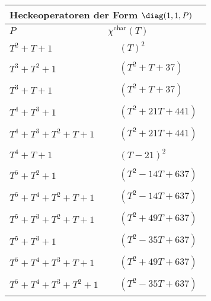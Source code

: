 \begin{tabular}{| l | l |}
\multicolumn{2}{l}{\bf Heckeoperatoren der Form $\diag(1,1,P)$} \\
\hline
$P$ & $\chi^\text{char}(T)$ \\
\hline
$T^2 + T + 1$ &
$\!\begin{aligned}
	&(T)^{2}\end{aligned}$ \\
\hline
$T^3 + T^2 + 1$ &
$\!\begin{aligned}
	&(T^{2} + T + 37)\end{aligned}$ \\
\hline
$T^3 + T + 1$ &
$\!\begin{aligned}
	&(T^{2} + T + 37)\end{aligned}$ \\
\hline
$T^4 + T^3 + 1$ &
$\!\begin{aligned}
	&(T^{2} + 21T + 441)\end{aligned}$ \\
\hline
$T^4 + T^3 + T^2 + T + 1$ &
$\!\begin{aligned}
	&(T^{2} + 21T + 441)\end{aligned}$ \\
\hline
$T^4 + T + 1$ &
$\!\begin{aligned}
	&(T - 21)^{2}\end{aligned}$ \\
\hline
$T^5 + T^2 + 1$ &
$\!\begin{aligned}
	&(T^{2} - 14T + 637)\end{aligned}$ \\
\hline
$T^5 + T^4 + T^2 + T + 1$ &
$\!\begin{aligned}
	&(T^{2} - 14T + 637)\end{aligned}$ \\
\hline
$T^5 + T^3 + T^2 + T + 1$ &
$\!\begin{aligned}
	&(T^{2} + 49T + 637)\end{aligned}$ \\
\hline
$T^5 + T^3 + 1$ &
$\!\begin{aligned}
	&(T^{2} - 35T + 637)\end{aligned}$ \\
\hline
$T^5 + T^4 + T^3 + T + 1$ &
$\!\begin{aligned}
	&(T^{2} + 49T + 637)\end{aligned}$ \\
\hline
$T^5 + T^4 + T^3 + T^2 + 1$ &
$\!\begin{aligned}
	&(T^{2} - 35T + 637)\end{aligned}$ \\

\end{tabular}
